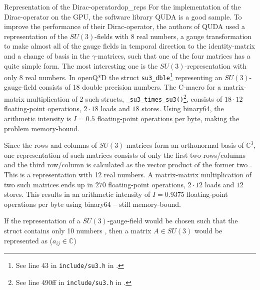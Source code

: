 \documentclass{article}
\theoremstyle{plain} %
\theoremstyle{convention} %
\theoremstyle{remark} %
\def\code#1{\texttt{#1}}
\numberwithin{equation}{section}
\begin{document}
\begin{proposal}{Representation of the Dirac-operator}{dop_reps}
For the implementation of the Dirac-operator on the GPU, the software library QUDA \cite{clark2010} is a good sample. To improve the performance of their Dirac-operator, the authors of QUDA used a representation of the $SU(3)$-fields with \num{8} real numbers, a gauge transformation to make almost all of the gauge fields in temporal direction to the identity-matrix and a change of basis in the $\gamma$-matrices, such that one of the four matrices has a quite simple form. The most interesting one is the $SU(3)$-representation with only \num{8} real numbers. In openQ*D the struct \code{su3\_dble}\footnote{See line 43 in \code{include/su3.h} in \cite{openqxd}.} representing an $SU(3)$-gauge-field consists of \num{18} double precision numbers. The C-macro for a matrix-matrix multiplication of 2 such structs, \code{\_su3\_times\_su3()}\footnote{See line 490ff in \code{include/su3.h} in \cite{openqxd}.}, consists of $18 \cdot 12$ floating-point operations, $2 \cdot 18$ loads and $18$ stores. Using \gls{binary64}, the arithmetic intensity is $I = 0.5$ floating-point operations per byte, making the problem memory-bound.

Since the rows and columns of $SU(3)$-matrices form an orthonormal basis of $\mathbb{C}^3$, one representation of such matrices consists of only the first two rows/columns and the third row/column is calculated as the vector product of the former two \cite{deforcrand1985}. This is a representation with \num{12} real numbers. A matrix-matrix multiplication of two such matrices ends up in $270$ floating-point operations, $2 \cdot 12$ loads and $12$ stores. This results in an arithmetic intensity of $I = 0.9375$ floating-point operations per byte using \gls{binary64} -- still memory-bound.

If the representation of a $SU(3)$-gauge-field would be chosen such that the struct contains only \num{10} numbers \cite{bunk1986}, then a matrix $A \in SU(3)$ would be represented as ($a_{ij} \in \mathbb{C}$)


\end{proposal}
\end{document}
